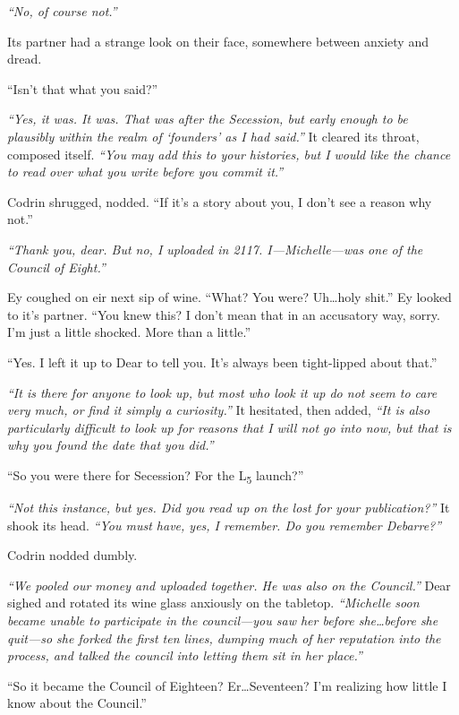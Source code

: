 \emph{``No, of course not.''}

Its partner had a strange look on their face, somewhere between anxiety and dread.

``Isn't that what you said?''

\emph{``Yes, it was. It was. That was after the Secession, but early enough to be plausibly within the realm of `founders' as I had said.''} It cleared its throat, composed itself. \emph{``You may add this to your histories, but I would like the chance to read over what you write before you commit it.''}

Codrin shrugged, nodded. ``If it's a story about you, I don't see a reason why not.''

\emph{``Thank you, dear. But no, I uploaded in 2117. I---Michelle---was one of the Council of Eight.''}

Ey coughed on eir next sip of wine. ``What? You were? Uh\ldots holy shit.'' Ey looked to it's partner. ``You knew this? I don't mean that in an accusatory way, sorry. I'm just a little shocked. More than a little.''

``Yes. I left it up to Dear to tell you. It's always been tight-lipped about that.''

\emph{``It is there for anyone to look up, but most who look it up do not seem to care very much, or find it simply a curiosity.''} It hesitated, then added, \emph{``It is also particularly difficult to look up for reasons that I will not go into now, but that is why you found the date that you did.''}

``So you were there for Secession? For the L\textsubscript{5} launch?''

\emph{``Not this instance, but yes. Did you read up on the lost for your publication?''} It shook its head. \emph{``You must have, yes, I remember. Do you remember Debarre?''}

Codrin nodded dumbly.

\emph{``We pooled our money and uploaded together. He was also on the Council.''} Dear sighed and rotated its wine glass anxiously on the tabletop. \emph{``Michelle soon became unable to participate in the council---you saw her before she\ldots before she quit---so she forked the first ten lines, dumping much of her reputation into the process, and talked the council into letting them sit in her place.''}

``So it became the Council of Eighteen? Er\ldots Seventeen? I'm realizing how little I know about the Council.''

